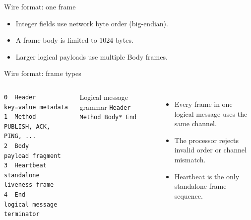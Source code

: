 \documentclass[aspectratio=169,10pt]{beamer}
\newcommand{\code}[1]{\texttt{\small #1}}
\begin{document}
\begin{frame}{Wire format: one frame}
  \begin{center}
  \end{center}
  \vspace{.6em}
  \begin{itemize}
    \item Integer fields use network byte order (big-endian).
    \item A frame body is limited to 1024 bytes.
    \item Larger logical payloads use multiple Body frames.
  \end{itemize}
\end{frame}

\begin{frame}[fragile]{Wire format: frame types}
  \begin{columns}[T,onlytextwidth]
    \begin{lstlisting}[style=wire]
0  Header      key=value metadata
1  Method      PUBLISH, ACK, PING, ...
2  Body        payload fragment
3  Heartbeat   standalone liveness frame
4  End         logical message terminator
    \end{lstlisting}
    \begin{block}{Logical message grammar}
      \centering
      \code{Header Method Body* End}
    \end{block}
    \begin{itemize}
      \item Every frame in one logical message uses the same channel.
      \item The processor rejects invalid order or channel mismatch.
      \item Heartbeat is the only standalone frame sequence.
    \end{itemize}
  \end{columns}
\end{frame}
\end{document}
